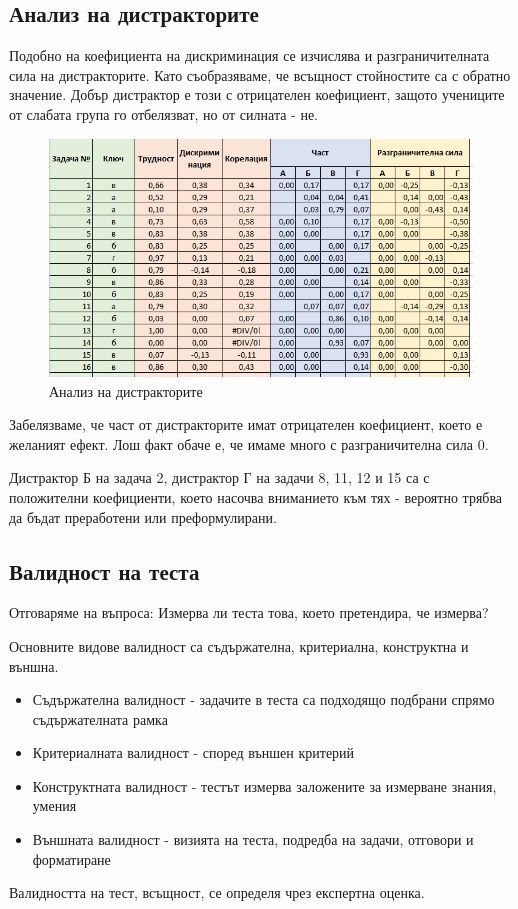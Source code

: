 \subsection{Анализ на дистракторите}
Подобно на коефициента на дискриминация се изчислява и разграничителната сила на дистракторите. Като съобразяваме, че всъщност стойностите са с обратно значение. Добър дистрактор е този с отрицателен коефициент, защото учениците от слабата група го отбелязват, но от силната - не.
\begin{figure}[H]
    \centering
    \includegraphics[width=\linewidth]{resources/distraktori.png}
    \caption{Анализ на дистракторите}
\end{figure}
Забелязваме, че част от дистракторите имат отрицателен коефициент, което е желаният ефект. Лош факт обаче е, че имаме много с разграничителна сила 0.

Дистрактор Б на задача 2, дистрактор Г на задачи 8, 11, 12 и 15 са с положителни коефициенти, което насочва вниманието към тях - вероятно трябва да бъдат преработени или преформулирани.

\subsection{Валидност на теста}
Отговаряме на въпроса: Измерва ли теста това, което претендира, че измерва?

Основните видове валидност са съдържателна, критериална, конструктна и външна.
\begin{itemize}
    \item Съдържателна валидност - задачите в теста са подходящо подбрани спрямо съдържателната рамка
    \item Критериалната валидност - според външен критерий
    \item Конструктната валидност - тестът измерва заложените за измерване знания, умения
    \item Външната валидност - визията на теста, подредба на задачи, отговори и форматиране
\end{itemize}
Валидността на тест, всъщност, се определя чрез експертна оценка.

